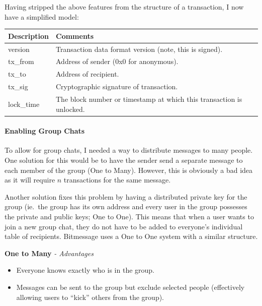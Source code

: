 \documentclass{article}
\begin{document}
Having stripped the above features from the structure of a transaction, I now have a simplified model:
\begin{table}[H]
\centering
\begin{tabular}{|l|p{8.5cm}|}
\hline
\rowcolor{tblgrey}
Description & Comments                                                  \\ \hline
version     & Transaction data format version (note, this is signed).   \\ \hline
tx\_from    & Address of sender (0x0 for anonymous).                    \\ \hline
tx\_to      & Address of recipient.                                     \\ \hline
tx\_sig     & Cryptographic signature of transaction.                   \\ \hline
lock\_time  & The block number or timestamp at which this transaction is unlocked. \\ \hline
\end{tabular}
\end{table}

\paragraph{Enabling Group Chats}
To allow for group chats, I needed a way to distribute messages to many people. One solution for this would be to have the sender send a separate message to each member of the group (One to Many). However, this is obviously a bad idea as it will require $n$ transactions for the same message.

Another solution fixes this problem by having a distributed private key for the group (ie.\ the group has its own address and every user in the group possesses the private  and public keys; One to One). This means that when a user wants to join a new group chat, they do not have to be added to everyone's individual table of recipients. Bitmessage uses a One to One system with a similar structure.

\newpage

\textbf{One to Many}
\textit{ - Advantages}
\begin{itemize}
    \item Everyone knows exactly who is in the group.
    \item Messages can be sent to the group but exclude selected people (effectively allowing users to ``kick'' others from the group).
\end{itemize}
\end{document}
